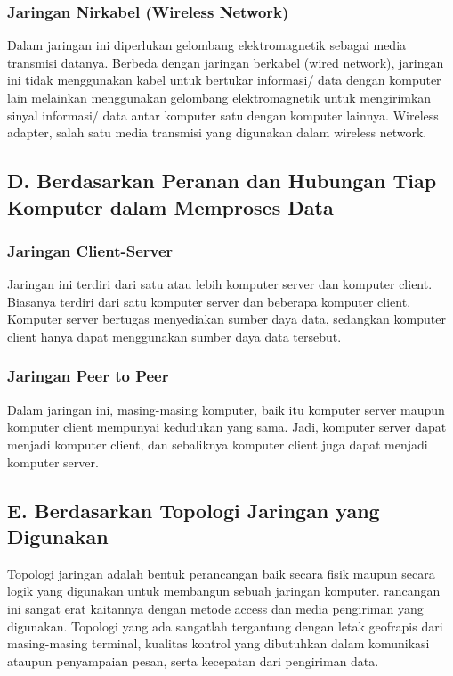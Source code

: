   \subsubsection{ Jaringan Nirkabel (Wireless Network)}
    Dalam jaringan ini diperlukan gelombang elektromagnetik sebagai media transmisi datanya. Berbeda dengan jaringan berkabel (wired network), jaringan ini tidak menggunakan kabel untuk bertukar informasi/ data dengan komputer lain melainkan menggunakan gelombang elektromagnetik untuk mengirimkan sinyal informasi/ data antar komputer satu dengan komputer lainnya. Wireless adapter, salah satu media transmisi yang digunakan dalam wireless network.
\subsection{D. Berdasarkan Peranan dan Hubungan Tiap Komputer dalam Memproses Data}
  \subsubsection{ Jaringan Client-Server}
    Jaringan ini terdiri dari satu atau lebih komputer server dan komputer client. Biasanya terdiri dari satu komputer server dan beberapa komputer client. Komputer server bertugas menyediakan sumber daya data, sedangkan komputer client hanya dapat menggunakan sumber daya data tersebut.
  \subsubsection{ Jaringan Peer to Peer}
    Dalam jaringan ini, masing-masing komputer, baik itu komputer server maupun komputer client mempunyai kedudukan yang sama. Jadi, komputer server dapat menjadi komputer client, dan sebaliknya komputer client juga dapat menjadi komputer server.
\subsection{E. Berdasarkan Topologi Jaringan yang Digunakan}
  Topologi jaringan adalah bentuk perancangan baik secara fisik maupun secara logik yang digunakan untuk membangun sebuah jaringan komputer. rancangan ini sangat erat kaitannya dengan metode access dan media pengiriman yang digunakan. Topologi yang ada sangatlah tergantung dengan letak geofrapis dari masing-masing terminal, kualitas kontrol yang dibutuhkan dalam komunikasi ataupun penyampaian pesan, serta kecepatan dari pengiriman data.
